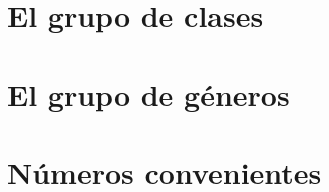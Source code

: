 \section{El grupo de clases}\label{sec:clases}


\section{El grupo de g\'eneros}\label{sec:generos}


\section{N\'umeros convenientes}\label{sec:convenientes}


